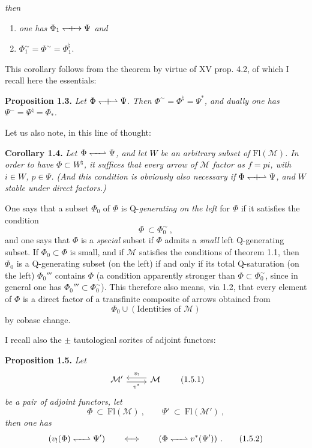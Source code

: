\documentclass[11pt]{article}
\newcommand{\printedpage}[1]{\marginpar{\footnotesize p.~#1}}
\newcommand{\msp}[1]{\marginpar{\footnotesize [#1]}}
\newcommand{\Qorth}{\mathrel{\leftharpoondown\mkern-6mu\relbar\mkern-6mu\rightharpoonup}}
\newcommand{\Qorthx}{\mathrel{\leftharpoondown\mkern-9mu{+}\mkern-9mu\rightharpoonup}}
\newcommand{\Qorthxfull}{\mathrel{\leftharpoondown\mkern-9mu{+}\mkern-9mu\rightarrow}}
\begin{document}
\printedpage{4}

\msp{page 6}
\textit{then}
\begin{enumerate}[label={}]
\item[a)] \textit{one has $\Phi_1 \Qorthxfull \Psi$ and} %
\item[b)] $\Phi_1^{\sim} = \Phi^{\sim} = \Phi_1^{\natural}$.
\end{enumerate}
This corollary follows from the theorem by virtue of XV prop. 4.2, of which I recall here the essentials:

\textbf{Proposition 1.3.} \textit{Let $\Phi \Qorthx \Psi$. Then $\Phi^{\sim} = \Phi^{\natural} = \Psi^{*}$, and dually one has $\Psi^{-} = \Psi^{\natural} = \Phi_{*}$.}

Let us also note, in this line of thought:

\textbf{Corollary 1.4.} \textit{Let $\Phi \Qorth \Psi$, and let $W$ be an arbitrary subset of $\mathrm{Fl}(\mathcal{M})$. In order to have $\Phi \subset W^{\natural}$, it suffices that every arrow of $\mathcal{M}$ factor as $f = pi$, with $i \in W$, $p \in \Psi$. (And this condition is obviously also necessary if $\Phi \Qorthx \Psi$, and $W$ stable under direct factors.)}

One says that a subset $\Phi_0$ of $\Phi$ is Q-\textit{generating on the left} for $\Phi$ if it satisfies the condition
\[
\Phi \ \subset \Phi_0^{\sim}\ , \tag*{(1.9)}
\]
and one says that $\Phi$ is a \textit{special} subset if $\Phi$ admits a \textit{small} left Q-generating subset. If $\Phi_0 \subset \Phi$ is small, and if $\mathcal{M}$ satisfies the conditions of theorem 1.1, then $\Phi_0$ is a Q-generating subset (on the left) if and only if its total Q-saturation (on the left) $\Phi_0'''$ contains $\Phi$ (a condition apparently stronger than $\Phi \subset \Phi_0^{\sim}$, since in general one has $\Phi_0''' \subset \Phi_0^{\sim}$). This therefore also means, via 1.2, that every \msp{page 7} element of $\Phi$ is a direct factor of a transfinite composite of arrows obtained from
\[
\Phi_0 \cup (\text{Identities of } \mathcal{M})
\]
by cobase change.

I recall also the $\pm$ tautological sorites of adjoint functors:

\textbf{Proposition 1.5.} \textit{Let}
\[
\begin{tikzcd}
\mathcal{M}' \arrow[r, shift right=1, "v^{*}"'] & \mathcal{M} \arrow[l, shift right=1, "v_{!}"']
\end{tikzcd}
\tag*{(1.5.1)}
\]
\textit{be a pair of adjoint functors, let}
\[
\Phi \ \subset\ \mathrm{Fl}(\mathcal{M})\ , \qquad \Psi' \ \subset\ \mathrm{Fl}(\mathcal{M}')\ ,
\]
\textit{then one has}
\[
(v_{!}(\Phi) \Qorth \Psi') \qquad \Longleftrightarrow \qquad (\Phi \Qorth v^{*}(\Psi'))\ . \tag*{(1.5.2)}
\]
\end{document}

